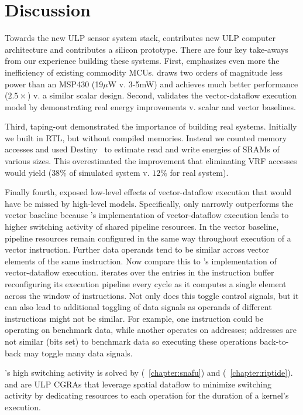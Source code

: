 \section{Discussion}
\label{manic:discuss}
Towards the new ULP sensor system stack, \manic contributes new ULP computer architecture and \msilicon contributes a silicon prototype.
% 
There are four key take-aways from our experience building these systems.
% 
First, \msilicon emphasizes even more the inefficiency of existing commodity MCUs.
% 
\manic draws two orders of magnitude less power than an MSP430 (19$\mu$W v. 3-5mW) and achieves much better performance ($2.5\times$) v. a similar scalar design.
% 
Second, \msilicon validates the vector-dataflow execution model by demonstrating real energy improvements v. scalar and vector baselines.


Third, taping-out \msilicon demonstrated the importance of building real systems.
% 
Initially we built \manic in RTL, but without compiled memories.
% 
Instead we counted memory accesses and used Destiny~\cite{destiny} to estimate read and write energies of SRAMs of various sizes.
% 
This overestimated the improvement that eliminating VRF accesses would yield ($38\%$ of simulated system v. $12\%$ for real system).

Finally fourth, \msilicon exposed low-level effects of vector-dataflow execution that would have be missed by high-level models.
% 
Specifically, \manic only narrowly outperforms the vector baseline because \manic's implementation of vector-dataflow execution leads to higher switching activity of shared pipeline resources.
% 
In the vector baseline, pipeline resources remain configured in the same way throughout execution of a vector instruction.
% 
Further data operands tend to be similar across vector elements of the same instruction.
% 
Now compare this to \manic's implementation of vector-dataflow execution.
% 
\manic iterates over the entries in the instruction buffer reconfiguring its execution pipeline every cycle as it computes a single element across the window of instructions.
% 
Not only does this toggle control signals, but it can also lead to additional toggling of data signals as operands of different instructions might not be similar.
% 
For example, one instruction could be operating on benchmark data, while another operates on addresses; addresses are not similar (bits set) to benchmark data so executing these operations back-to-back may toggle many data signals. 

\manic's high switching activity is solved by \snafu (~\autoref{chapter:snafu}) and \riptide (~\autoref{chapter:riptide}).
% 
\riptide and \snafu are ULP CGRAs that leverage spatial dataflow to minimize switching activity by dedicating resources to each operation for the duration of a kernel's execution.
